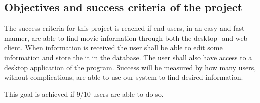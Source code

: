 
\subsection{Objectives and success criteria of the project}

The success criteria for this project is reached if end-users, in an easy and fast manner, are able to find movie information through both the desktop- and web-client. When information is received the user shall be able to edit some information and store the it in the database. The user shall also have access to a desktop application of the program. Success will be measured by how many users, without complications, are able to use our system to find desired information.

This goal is achieved if 9/10 users are able to do so.


